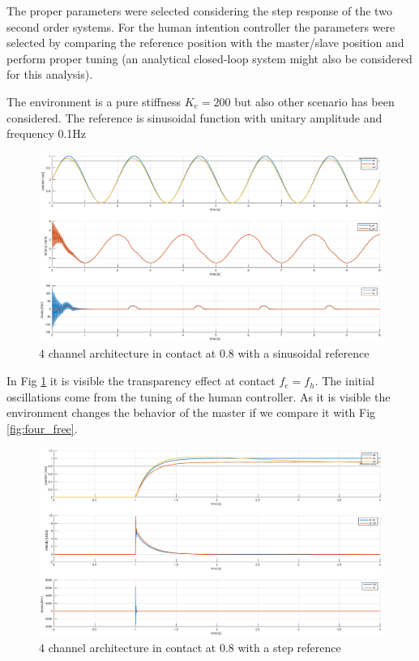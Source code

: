 \documentclass[a4paper,12pt]{article}
\begin{document}
\bigskip
\noindent The proper parameters were selected considering the step response of the two second order systems. For the human intention controller the parameters were selected by comparing the reference position with the master/slave position and perform proper tuning (an analytical closed-loop system might also be considered for this analysis).

\bigskip
The environment is a pure stiffness $K_e = 200$ but also other scenario has been considered. The reference is sinusoidal function with unitary amplitude and frequency 0.1Hz

\begin{figure}[H]
    \begin{center}
        \hspace*{-4.4cm}
        \includegraphics[scale=0.5]{images/four_contact_05.eps}
    \end{center}
    \caption{4 channel architecture in contact at 0.8 with a sinusoidal reference}
    \label{fig:four_cotact}
\end{figure}

In Fig \ref{fig:four_cotact} it is visible the transparency effect at contact $f_e=f_h$. The initial oscillations come from the tuning of the human controller. As it is visible the environment changes the behavior of the master if we compare it with Fig \ref{fig:four_free}.

\begin{figure}[H]
    \begin{center}
        \hspace*{-4.4cm}
        \includegraphics[scale=0.5]{images/four_step_contact_05.eps}
    \end{center}
    \caption{4 channel architecture in contact at 0.8 with a step reference}
    \label{fig:four_step}
\end{figure}
\end{document}
